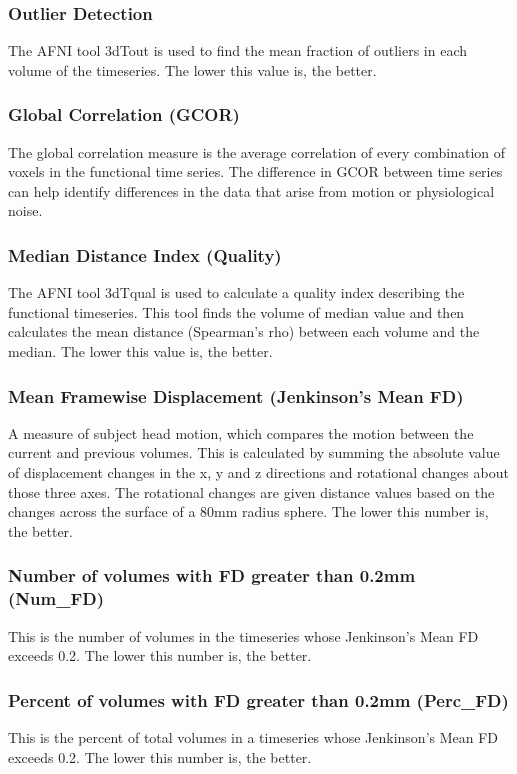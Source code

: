 \documentclass{frontiersSCNS} %
\begin{document}
\subsubsection{Outlier Detection}
\label{sec:13}
The AFNI tool 3dTout is used to find the mean fraction of outliers in each volume of the timeseries. The lower this value is, the better.
\subsubsection{Global Correlation (GCOR)}
\label{sec:14}
The global correlation measure is the average correlation of every combination of voxels in the functional time series. The difference in GCOR between time series can help identify differences in the data that arise from motion or physiological noise.
\subsubsection{Median Distance Index (Quality)}
\label{sec:15}
The AFNI tool 3dTqual is used to calculate a quality index describing the functional timeseries. This tool finds the volume of median value and then calculates the mean distance (Spearman’s rho) between each volume and the median. The lower this value is, the better.
\subsubsection{Mean Framewise Displacement (Jenkinson’s Mean FD)}
\label{sec:16}
A measure of subject head motion, which compares the motion between the current and previous volumes. This is calculated by summing the absolute value of displacement changes in the x, y and z directions and rotational changes about those three axes. The rotational changes are given distance values based on the changes across the surface of a 80mm radius sphere. The lower this number is, the better.
\subsubsection{Number of volumes with FD greater than 0.2mm (Num\_FD)}
\label{sec:17}
This is the number of volumes in the timeseries whose Jenkinson’s Mean FD exceeds 0.2. The lower this number is, the better.
\subsubsection{Percent of volumes with FD greater than 0.2mm (Perc\_FD)}
\label{sec:18}
This is the percent of total volumes in a timeseries whose Jenkinson’s Mean FD exceeds 0.2. The lower this number is, the better.
\end{document}
